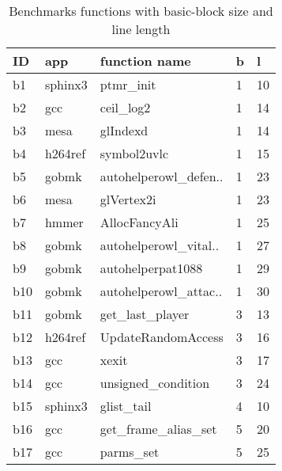\begin{longtable}{|l|l|l|l|l|}
\caption{\label{tab:benchmarks}{Benchmarks functions with basic-block size and line length}}\\
\hline
{ID}&{app}&{function name}&{b}&{l}\\
\hline
b1&sphinx3&ptmr\_init&1&10
\\
b2&gcc&ceil\_log2&1&14
\\
b3&mesa&glIndexd&1&14
\\
b4&h264ref&symbol2uvlc&1&15
\\
b5&gobmk&autohelperowl\_defen..&1&23
\\
b6&mesa&glVertex2i&1&23
\\
b7&hmmer&AllocFancyAli&1&25
\\
b8&gobmk&autohelperowl\_vital..&1&27
\\
b9&gobmk&autohelperpat1088&1&29
\\
b10&gobmk&autohelperowl\_attac..&1&30
\\
b11&gobmk&get\_last\_player&3&13
\\
b12&h264ref&UpdateRandomAccess&3&16
\\
b13&gcc&xexit&3&17
\\
b14&gcc&unsigned\_condition&3&24
\\
b15&sphinx3&glist\_tail&4&10
\\
b16&gcc&get\_frame\_alias\_set&5&20
\\
b17&gcc&parms\_set&5&25
\\
\hline
\end{longtable}
